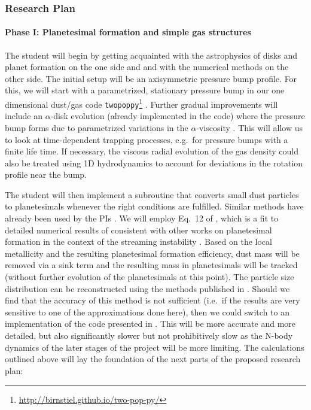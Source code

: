 \documentclass[10pt,fleqn,twoside]{article}
\newcommand{\twopoppy}{\texttt{twopoppy}\xspace}
\begin{document}
\subsubsection{Research Plan}

\paragraph{Phase I: Planetesimal formation and simple gas
structures}
\label{sec:phaseI}

The student will begin by getting acquainted with the astrophysics of
disks and planet formation on the one side and and with the numerical
methods on the other side. The initial setup will be an axisymmetric
pressure bump profile. For this, we will start with a parametrized,
stationary pressure bump in our one dimensional dust/gas code
\twopoppy\footnote{\url{http://birnstiel.github.io/two-pop-py/}}
\citep{2012A&A...539A.148B}. Further gradual improvements will include
an $\alpha$-disk evolution (already implemented in the code) where the
pressure bump forms due to parametrized variations in the
$\alpha$-viscosity \citep{2007ApJ...664L..55K}. This will allow us to
look at time-dependent trapping processes, e.g.\ for pressure bumps
with a finite life time. If necessary, the viscous radial evolution of
the gas density could also be treated using 1D hydrodynamics to
account for deviations in the rotation profile near the bump.

The student will then implement a subroutine that converts small dust
particles to planetesimals whenever the right conditions are
fulfilled. Similar methods have already been used by the PIs
\citep[][and Klahr, Birnstiel, Lenz, in prep.]{2014A&A...572A..78D}.
We will employ Eq.~12 of \citet{2014A&A...572A..78D}, which is a fit
to detailed numerical results of \citet{2010ApJ...722.1437B} consistent
with other works on planetesimal formation in the context of the
streaming instability \citep[e.g.,][]{2009ApJ...704L..75J}. Based on
the local metallicity and the resulting planetesimal formation
efficiency, dust mass will be removed via a sink term and the
resulting mass in planetesimals will be tracked (without further
evolution of the planetesimals at this point). The particle size
distribution can be reconstructed using the methods published in
\citet{2015ApJ...813L..14B}. Should we find that the accuracy of this
method is not sufficient (i.e.\ if the results are very sensitive to
one of the approximations done here), then we could switch to an
implementation of the code presented in \citet{2010A&A...513A..79B}.
This will be more accurate and more detailed, but also significantly
slower but not prohibitively slow as the N-body dynamics of the later
stages of the project will be more limiting. The calculations outlined
above will lay the foundation of the next parts of the proposed
research plan:
\end{document}
